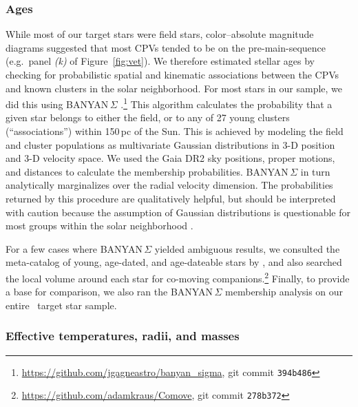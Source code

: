 \documentclass[11pt,twocolumn,tighten]{aastex63}
\begin{document}
\subsubsection{Ages}
While most of our target stars were field stars, color--absolute
magnitude diagrams suggested that most CPVs tended to be on the
pre-main-sequence (e.g.\ panel {\it (k)} of Figure~\ref{fig:vet}).  We
therefore estimated stellar ages by checking for probabilistic spatial
and kinematic associations between the CPVs and known clusters in the
solar neighborhood.  For most stars in our sample, we did this using
BANYAN\,$\Sigma$
\citep{2018ApJ...856...23G}.\footnote{\url{https://github.com/jgagneastro/banyan_sigma},
git commit \texttt{394b486}} This algorithm calculates the probability
that a given star belongs to either the field, or to any of 27 young
clusters (``associations'') within 150\,pc of the Sun.  This is
achieved by modeling the field and cluster populations as multivariate
Gaussian distributions in 3-D position and 3-D velocity space.  We
used the Gaia DR2 sky positions, proper motions, and distances to
calculate the membership probabilities.  BANYAN\,$\Sigma$ in turn
analytically marginalizes over the radial velocity dimension.  The
probabilities returned by this procedure are qualitatively helpful,
but should be interpreted with caution because the assumption of
Gaussian distributions is questionable for most groups within the
solar neighborhood \citep[see e.g.][Figure~10]{2021ApJ...917...23K}.

For a few cases where BANYAN\,$\Sigma$ yielded ambiguous results, we
consulted the meta-catalog of young, age-dated, and age-dateable stars
 by \citet{2022AJ....163..121B}, and also searched the local
volume around each star for co-moving
companions.\footnote{\url{https://github.com/adamkraus/Comove}, git
commit \texttt{278b372}} Finally, to provide a base for comparison, we
also ran the BANYAN\,$\Sigma$ membership analysis on our entire
\nstarssearched\ target star sample.

\subsubsection{Effective temperatures, radii, and masses}
\end{document}
